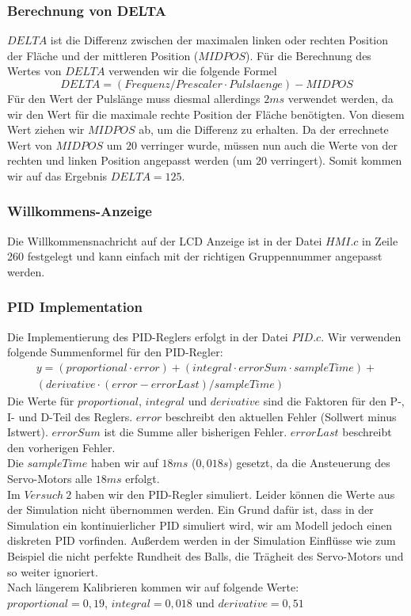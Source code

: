 \subsubsection{Berechnung von DELTA}
$DELTA$ ist die Differenz zwischen der maximalen linken oder rechten Position der Fläche und der mittleren Position ($MIDPOS$). Für die Berechnung des Wertes von $DELTA$ verwenden wir die folgende Formel
\begin{equation}
DELTA = (Frequenz / Prescaler \cdot Pulslaenge) - MIDPOS
\end{equation}
Für den Wert der Pulslänge muss diesmal allerdings $2 ms$ verwendet werden, da wir den Wert für die maximale rechte Position der Fläche benötigten. Von diesem Wert ziehen wir $MIDPOS$ ab, um die Differenz zu erhalten. Da der errechnete Wert von $MIDPOS$ um $20$ verringer wurde, müssen nun auch die Werte von der rechten und linken Position angepasst werden (um $20$ verringert). Somit kommen wir auf das Ergebnis $DELTA = 125$.

\subsubsection{Willkommens-Anzeige}
Die Willkommensnachricht auf der LCD Anzeige ist in der Datei $HMI.c$ in Zeile 260 festgelegt und kann einfach mit der richtigen Gruppennummer angepasst werden.

\subsubsection{PID Implementation}
Die Implementierung des PID-Reglers erfolgt in der Datei $PID.c$. Wir verwenden folgende Summenformel für den PID-Regler:
\begin{multline}
y = (proportional \cdot error) + (integral \cdot errorSum \cdot sampleTime) + \\
(derivative \cdot (error - errorLast) / sampleTime)
\end{multline}
Die Werte für $proportional$, $integral$ und $derivative$ sind die Faktoren für den P-, I- und D-Teil des Reglers. $error$ beschreibt den aktuellen Fehler (Sollwert minus Istwert). $errorSum$ ist die Summe aller bisherigen Fehler. $errorLast$ beschreibt den vorherigen Fehler. \\
Die $sampleTime$ haben wir auf $18 ms$ ($0,018s$) gesetzt, da die Ansteuerung des Servo-Motors alle $18 ms$ erfolgt. \\
Im $Versuch\ 2$ haben wir den PID-Regler simuliert. Leider können die Werte aus der Simulation nicht übernommen werden. Ein Grund dafür ist, dass in der Simulation ein kontinuierlicher PID simuliert wird, wir am Modell jedoch einen diskreten PID vorfinden. Außerdem werden in der Simulation Einflüsse wie zum Beispiel die nicht perfekte Rundheit des Balls, die Trägheit des Servo-Motors und so weiter ignoriert. \\
Nach längerem Kalibrieren kommen wir auf folgende Werte: \\
$proportional = 0,19$, $integral =0,018$ und $derivative = 0,51$


